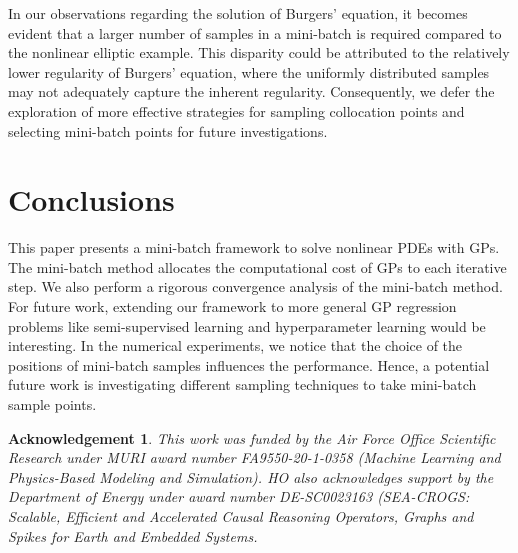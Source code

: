 \documentclass[10pt,reqno]{amsart}
\newcommand{\1}{{\chi}}
\numberwithin{equation}{section}
\theoremstyle{thmlemcorr}
\numberwithin{theorem}{section}
\theoremstyle{thmlemcorr*}
\theoremstyle{defi}
\theoremstyle{remexample}
\theoremstyle{ass}
\newtheorem*{Acknowledgement*}{Acknowledgement}
\begin{document}
In our observations regarding the solution of Burgers' equation, it becomes evident that a larger number of samples in a mini-batch is required compared to the nonlinear elliptic example. This disparity could be attributed to the relatively lower regularity of Burgers' equation, where the uniformly distributed samples may not adequately capture the inherent regularity. Consequently, we defer the exploration of more effective strategies for sampling collocation points and selecting mini-batch points for future investigations.









\section{Conclusions}
\label{secConclu}
This paper presents a mini-batch framework to solve nonlinear PDEs with GPs.
The mini-batch method allocates the computational cost of GPs to each iterative step. We also perform a rigorous convergence analysis of the mini-batch method. For future work, extending our framework to more general GP regression problems like semi-supervised learning and hyperparameter learning would be interesting. In the numerical experiments, we notice that 
the choice of the positions of mini-batch samples influences the performance. Hence, a potential future work is investigating different sampling techniques to take mini-batch sample points. 

\begin{Acknowledgement*}
This work was funded  by the Air Force Office Scientific Research under MURI award number FA9550-20-1-0358 (Machine Learning and Physics-Based Modeling and Simulation). HO also acknowledges support by the Department of Energy under award number DE-SC0023163 (SEA-CROGS: Scalable, Efficient and Accelerated Causal Reasoning Operators, Graphs and Spikes for Earth and Embedded Systems. 
\end{Acknowledgement*}


\appendix
\end{document}
